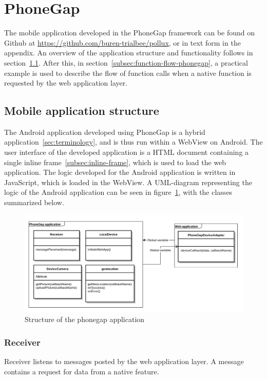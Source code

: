 \section{PhoneGap}\label{sec:phonegap}
The mobile application developed in the PhoneGap framework can be found on Github at \url{https://github.com/buren-trialbee/pollux}, or in text form in the appendix. An overview of the application structure and functionality follows in section~\ref{subsec:application-structure-phonegap}. After this, in section~\ref{subsec:function-flow-phonegap}, a practical example is used to describe the flow of function calls when a native function is requested by the web application layer.

\subsection{Mobile application structure} \label{subsec:application-structure-phonegap}
The Android application developed using PhoneGap is a hybrid application~\ref{sec:terminology}, and is thus run within a WebView on Android. The user interface of the developed application is a HTML document containing a single inline frame~\ref{subsec:inline-frame}, which is used to load the web application. The logic developed for the Android application is written in JavaScript, which is loaded in the WebView. A UML-diagram representing the logic of the Android application can be seen in figure~\ref{fig:phonegapuml}, with the classes summarized below.
\begin{figure}[h!]
	\centering
    \includegraphics[width=150mm,natwidth=1000,natheight=750]{./img/phonegapuml.png}
    \caption{Structure of the phonegap application}
    \label{fig:phonegapuml}
\end{figure}

\subsubsection{Receiver}
Receiver listens to messages posted by the web application layer. A message contains a request for data from a native feature.
\label{fig:phonegapflow}
